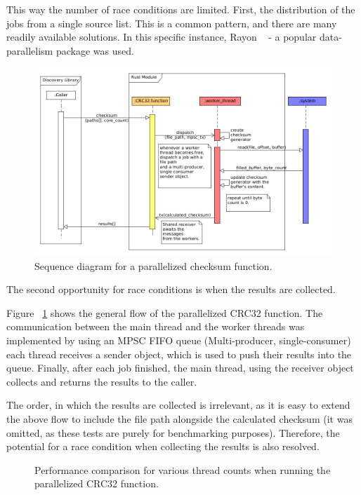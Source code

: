 This way the number of race conditions are limited.
First, the distribution of the jobs from a single source list.
This is a common pattern, and there are many readily available solutions.
In this specific instance, Rayon  ~\cite{Rayon} - a popular data-parallelism package was used.

\begin{figure}[H]
    \centering
    \includegraphics[width=12cm]{figures/checksum/simple_multi_crc}
    \caption{Sequence diagram for a parallelized checksum function.}
    \label{fig:checksum_fig_4}
\end{figure}

The second opportunity for race conditions is when the results are collected.

Figure ~\ref{fig:checksum_fig_4} shows the general flow of the parallelized CRC32 function.
The communication
between the main thread and the worker threads was implemented by using an MPSC FIFO queue (Multi-producer, single-consumer)
each thread receives a sender object, which is used to push their results into the queue.
Finally, after each job finished, the main thread, using the receiver object collects and returns the results to the caller.

The order, in which the results are collected is irrelevant, as it is easy to extend the above flow to include
the file path alongside the calculated checksum (it was omitted, as these tests are purely for benchmarking purposes).
Therefore, the potential for a race condition when collecting the results is also resolved.

\begin{figure}[H]
    \centering
    \begin{bchart}[step=50,max=400, unit=s]
        \medskip
        \medskip
        \medskip
        \medskip
        \medskip
    \end{bchart}
    \caption{Performance comparison for various thread counts when running the parallelized CRC32 function.}
    \label{fig:checksum_fig_5}
\end{figure}


